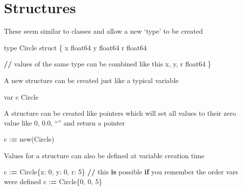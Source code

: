 \documentclass[]{book}
\newenvironment{Shaded}{\begin{snugshade}}{\end{snugshade}}
\newcommand{\KeywordTok}[1]{\textcolor[rgb]{0.13,0.29,0.53}{\textbf{#1}}}
\newcommand{\DecValTok}[1]{\textcolor[rgb]{0.00,0.00,0.81}{#1}}
\newcommand{\ControlFlowTok}[1]{\textcolor[rgb]{0.13,0.29,0.53}{\textbf{#1}}}
\newcommand{\OperatorTok}[1]{\textcolor[rgb]{0.81,0.36,0.00}{\textbf{#1}}}
\newcommand{\BuiltInTok}[1]{#1}
\newcommand{\NormalTok}[1]{#1}
\begin{document}
\section{Structures}\label{structures}

These seem similar to classes and allow a new `type' to be created

\begin{Shaded}
\begin{Highlighting}[]
\BuiltInTok{type}\NormalTok{ Circle struct \{}
\NormalTok{x float64}
\NormalTok{y float64}
\NormalTok{r float64}

    \OperatorTok{//}\NormalTok{ values of the same }\BuiltInTok{type}\NormalTok{ can be combined like this}
\NormalTok{    x, y, r float64 }
\NormalTok{\}                   }
\end{Highlighting}
\end{Shaded}

A new structure can be created just like a typical variable

\begin{Shaded}
\begin{Highlighting}[]
\NormalTok{var c Circle}
\end{Highlighting}
\end{Shaded}

A structure can be created like pointers which will set all values to
their zero value like 0, 0.0, ``'' and return a pointer

\begin{Shaded}
\begin{Highlighting}[]
\NormalTok{c :}\OperatorTok{=}\NormalTok{ new(Circle)}
\end{Highlighting}
\end{Shaded}

Values for a structure can also be defined at variable creation time

\begin{Shaded}
\begin{Highlighting}[]
\NormalTok{c :}\OperatorTok{=}\NormalTok{ Circle\{x: }\DecValTok{0}\NormalTok{, y: }\DecValTok{0}\NormalTok{, r: }\DecValTok{5}\NormalTok{\}}
\OperatorTok{//}\NormalTok{ this }\KeywordTok{is}\NormalTok{ possible }\ControlFlowTok{if}\NormalTok{ you remember the order }\BuiltInTok{vars}\NormalTok{ were defined}
\NormalTok{c :}\OperatorTok{=}\NormalTok{ Circle\{}\DecValTok{0}\NormalTok{, }\DecValTok{0}\NormalTok{, }\DecValTok{5}\NormalTok{\}}
\end{Highlighting}
\end{Shaded}
\end{document}
